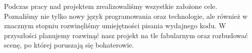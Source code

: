 \documentclass[openright]{xmgr}
\begin{document}
\summary
	Podczas pracy nad projektem zrealizowaliśmy wszystkie założone cele.  Poznaliśmy nie tylko nowy język programowania oraz technologie, ale również w znacznym stopniu rozwinęliśmy umiejętności pisania wydajnego kodu. W przyszłości planujemy rozwinąć nasz projekt na tle fabularnym oraz rozbudować scenę, po której poruszają się bohaterowie.
\oswiadczenie
\end{document}
